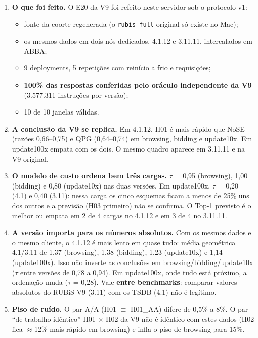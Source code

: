 \begin{enumerate}
\item \textbf{O que foi feito.} O E20 da V9 foi refeito neste servidor sob o protocolo v1:
\begin{itemize}
\item fonte da coorte regenerada (o \texttt{rubis\_full} original só existe no Mac);
\item os mesmos dados em dois nós dedicados, 4.1.12 e 3.11.11, intercalados em ABBA;
\item 9 deployments, 5 repetições com reinício a frio e \envrawrows{} requisições;
\item \textbf{100\% das respostas conferidas pelo oráculo independente da V9} (3.577.311 instruções por versão);
\item 10 de 10 janelas válidas.
\end{itemize}
\item \textbf{A conclusão da V9 se replica.} Em 4.1.12, H01 é mais rápido que NoSE (razões 0,66--0,75) e QPG (0,64--0,74) em browsing, bidding e update10x. Em update100x empata com os dois. O mesmo quadro aparece em 3.11.11 e na V9 original.
\item \textbf{O modelo de custo ordena bem três cargas.} $\tau$ = 0,95 (browsing), 1,00 (bidding) e 0,80 (update10x) nas duas versões. Em update100x, $\tau$ = 0,20 (4.1) e 0,40 (3.11): nessa carga os cinco esquemas ficam a menos de 25\% uns dos outros e a previsão (H03 primeiro) não se confirma. O Top-1 previsto é o melhor ou empata em 2 de 4 cargas no 4.1.12 e em 3 de 4 no 3.11.11.
\item \textbf{A versão importa para os números absolutos.} Com os mesmos dados e o mesmo cliente, o 4.1.12 é mais lento em quase tudo: média geométrica 4.1/3.11 de 1,37 (browsing), 1,38 (bidding), 1,23 (update10x) e 1,14 (update100x). Isso não inverte as conclusões em browsing/bidding/update10x ($\tau$ entre versões de 0,78 a 0,94). Em update100x, onde tudo está próximo, a ordenação muda ($\tau$ = 0,28). Vale \textbf{entre benchmarks}: comparar valores absolutos do RUBiS V9 (3.11) com os TSDB (4.1) não é legítimo.
\item \textbf{Piso de ruído.} O par A/A (H01 $\equiv$ H01\_AA) difere de 0,5\% a 8\%. O par ``de trabalho idêntico'' H01 $\times$ H02 da V9 não é idêntico com estes dados (H02 fica $\approx$12\% mais rápido em browsing) e infla o piso de browsing para 15\%.
\end{enumerate}
